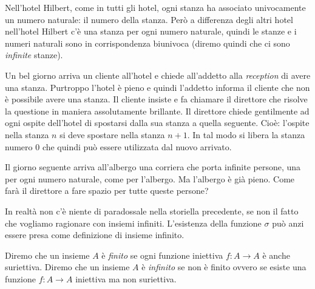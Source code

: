 \documentclass[italian,a4paper,hidelinks,headinclude]{scrartcl}
\newcommand{\myemph}[1]{\emph{#1}\marginpar{#1}}
\begin{document}
\begin{exercise}
  Nell'hotel Hilbert, come in tutti gli hotel, ogni stanza ha associato univocamente
  un numero naturale: il numero della stanza.
  Però a differenza degli altri hotel nell'hotel Hilbert c'è una stanza per
  ogni numero naturale, quindi le stanze e i numeri naturali sono in corrispondenza
  biunivoca (diremo quindi che ci sono \emph{infinite} stanze).

  Un bel giorno arriva un cliente all'hotel e chiede all'addetto
  alla \emph{reception} di avere una stanza. Purtroppo l'hotel è pieno e
  quindi l'addetto informa il cliente che non è possibile avere una stanza.
  Il cliente insiste e fa chiamare il direttore che risolve la questione in
  maniera assolutamente brillante.
  Il direttore chiede gentilmente ad ogni ospite dell'hotel di spostarsi dalla sua
  stanza a quella seguente. Cioè: l'ospite nella stanza $n$ si deve spostare nella
  stanza $n+1$. In tal modo si libera la stanza numero $0$ che quindi può essere
  utilizzata dal nuovo arrivato.

  Il giorno seguente arriva all'albergo una corriera che porta infinite persone,
  una per ogni numero naturale, come per l'albergo. Ma l'albergo è già pieno.
  Come farà il direttore a fare spazio per tutte queste persone?
\end{exercise}

In realtà non c'è niente di paradossale nella storiella precedente, se non il
fatto che vogliamo ragionare con insiemi infiniti.
L'esistenza della funzione $\sigma$ può anzi essere presa come definizione
di insieme infinito.

\begin{definition}
  Diremo che un insieme $A$ è \myemph{finito}
  se ogni funzione iniettiva $f\colon A \to A$ è anche suriettiva.
  Diremo che un insieme $A$ è \myemph{infinito}
  se non è finito ovvero se esiste una funzione $f\colon A \to A$
  iniettiva ma non suriettiva.
\end{definition}
\end{document}
